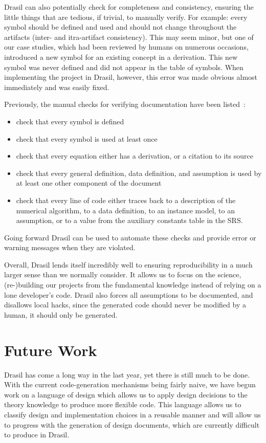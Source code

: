 \documentclass[sigconf]{acmart}
\begin{document}
{Drasil can also potentially check for completeness and consistency, ensuring 
the little things that are tedious, if trivial, to manually verify. For 
example: every symbol should be defined and used and should not change 
throughout the artifacts (inter- and itra-artifact consistency). This may seem 
minor, but one of our case studies, which had been reviewed by humans on 
numerous occasions, introduced a new symbol for an existing concept in a 
derivation. This new symbol was never defined and did not appear in the table of 
symbols. When implementing the project in Drasil, however, this error was made 
obvious almost immediately and was easily fixed.

Previously, the manual checks for verifying documentation have been
listed~\cite{SmithAndKoothoor2016}:
\begin{itemize}
\item check that every symbol is defined
\item check that every symbol is used at least once
\item check that every equation either has a derivation, or a citation to its
  source
\item check that every general definition, data definition, and assumption is
  used by at least one other component of the document
\item check that every line of code either traces back to a description of the
  numerical algorithm, to a data definition, to an instance model, to an
  assumption, or to a value from the auxiliary constants table in the SRS.
\end{itemize}
Going forward Drasil can be used to automate these checks and provide error or
warning messages when they are violated.

Overall, Drasil lends itself incredibly well to ensuring reproducibility in a 
much larger sense than we normally consider. It allows us to focus on the 
science, (re-)building our projects from the fundamental knowledge instead of 
relying on a lone developer's code. Drasil also forces all assumptions to be 
documented, and disallows local hacks, since the generated code should never be 
modified by a human, it should only be generated.

\section{Future Work} \label{SecFuture}

Drasil has come a long way in the last year, yet there is still much to be 
done. With the current code-generation mechanisms being fairly naive, we have 
begun work on a language of design which allows us to apply design decisions to 
the theory knowledge to produce more flexible code. This language allows us to 
classify design and implementation choices in a reusable manner and will 
allow us to progress with the generation of design documents, which are 
currently difficult to produce in Drasil.

}
\end{document}
